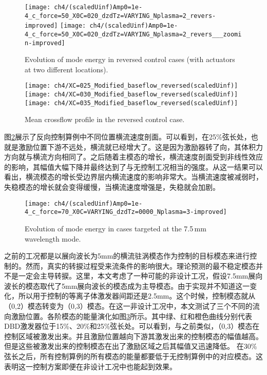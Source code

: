 \begin{figure}
\centering
\texttt{[image: ch4/(scaledUinf)Amp0=1e-4\_c\_force=50\_X0C=020\_dzdTz=VARYING\_Nplasma=2\_revers-improved]}
\texttt{[image: ch4/(scaledUinf)Amp0=1e-4\_c\_force=50\_X0C=020\_dzdTz=VARYING\_Nplasma=2\_revers\_\_\_zoomin-improved]}
\caption{Evolution of mode energy in reversed control cases (with actuators at two different locations).}%
\label{f:model_energy_revers}
\end{figure}

\begin{figure}
\centering
\texttt{[image: ch4/XC=025\_Modified\_baseflow\_reversed(scaledUinf)]}
\texttt{[image: ch4/XC=030\_Modified\_baseflow\_reversed(scaledUinf)]}
\texttt{[image: ch4/XC=035\_Modified\_baseflow\_reversed(scaledUinf)]}
\caption{Mean crossflow profile in the reversed control case.}%
\label{f:inverse_meanflow}
\end{figure}

图\ref{f:inverse_meanflow}展示了反向控制算例中不同位置横流速度剖面。可以看到，在25\%弦长处，也就是激励位置下游不远处，横流就已经增大了。这是因为激励器转了向，其体积力方向就与横流方向相同了。之后随着主模态的增长，横流速度剖面受到非线性效应的影响，其幅值大幅下降并最终达到了与无控制工况相当的强度。从这一结果可以看出，横流模态的增长受边界层内横流速度的影响非常大。当横流速度被减弱时，失稳模态的增长就会变得缓慢，当横流速度增强是，失稳就会加剧。
\begin{figure}
\centering
\texttt{[image: ch4/(scaledUinf)Amp0=1e-4\_c\_force=70\_X0C=VARYING\_dzdTz=0000\_Nplasma=3-improved]}
\caption{Evolution of mode energy in cases targeted at the 7.5\,mm wavelength mode.}%
\label{f:7.5mm}
\end{figure}

之前的工况都是以展向波长为5mm的横流驻涡模态作为控制的目标模态来进行控制的。然而，真实的转捩过程受来流条件的影响很大。理论预测的最不稳定模态并不是一定会主导转捩。这里，本文考虑了一种可能的非设计工况，假设7.5mm展向波长的模态取代了5mm展向波长的模态成为主导模态。由于实现并不知道这一变化，所以用于控制的等离子体激发器间距还是2.5mm。这个时候，控制模态就从（0,2）模态转变为（0,3）模态。在这一非设计工况中，本文测试了三个不同的流向激励位置。各阶模态的能量演化如图\ref{f:7.5mm}所示。其中绿、红和橙色曲线分别代表DBD激发器位于15\%、20\%和25\%弦长处。可以看到，与之前类似，（0,3）模态在控制区域被激发出来。并且激励位置越向下游其激发出来的控制模态的幅值越高。但是这些被激发出来的控制模态在出了激励区域之后其幅值又迅速降低。 在30\%弦长之后，所有控制算例的所有模态的能量都要低于无控制算例中的对应模态。这表明这一控制方案即便在非设计工况中也能起到效果。

